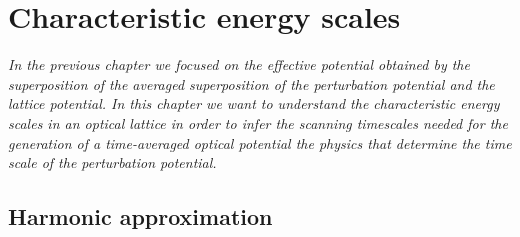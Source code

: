 \chapter{Characteristic energy scales}

\textit{In the previous chapter we focused on the effective potential obtained
by the superposition of the averaged superposition of the perturbation
potential and the lattice potential. In this chapter we want to understand the
characteristic energy scales in an optical lattice in order to infer the
scanning timescales needed for the generation of a time-averaged optical
potential the physics that determine the time scale of the perturbation
potential.}

\section{Harmonic approximation}

